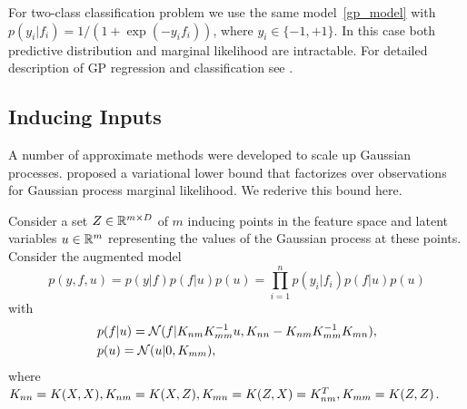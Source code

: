   For two-class classification problem we use the same model~\eqref{gp_model} with $p(y_i | f_i)=1/(1+\exp(-y_if_i))$, where $y_i\in\{-1,+1\}$. In this case both predictive distribution and marginal likelihood are intractable. For detailed description of GP regression and classification see \citet{rasmussen2006}.

\subsection{Inducing Inputs}
\label{inducing_inputs}

  A number of approximate methods were developed to scale up Gaussian processes.
  \citet{hensman2013} proposed a variational lower bound that factorizes over
  observations for Gaussian process marginal likelihood. We rederive
  this bound here.

  Consider a set $Z \in \mathbb{R}^{m \times D}$ of $m$ inducing points in the feature space and latent variables $u \in \mathbb{R}^m$ representing the values of
  the Gaussian process at these points. Consider the augmented model
  \[
    p(y, f, u) = p(y | f) p(f | u) p(u) = \prod_{i = 1}^ n p(y_i | f_i) p(f | u) p(u)
  \]
  with 
  \begin{align}
    &p(f | u) = \mathcal{N}(f | K_{nm} K_{mm}^{-1} u, K_{nn} - K_{nm} K_{mm}^{-1} K_{mn}),\label{priors}\\
    &p(u)= \mathcal{N}(u | 0, K_{mm}),\notag
  \end{align}
  where $K_{nn} = K(X, X), K_{nm} = K(X, Z), K_{mn} = K(Z, X) = K_{nm}^T, K_{mm} = K(Z, Z)$.

